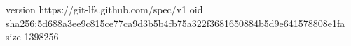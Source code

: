 version https://git-lfs.github.com/spec/v1
oid sha256:5d688a3ee9c815ce77ca9d3b5b4fb75a322f3681650884b5d9e641578808e1fa
size 1398256
